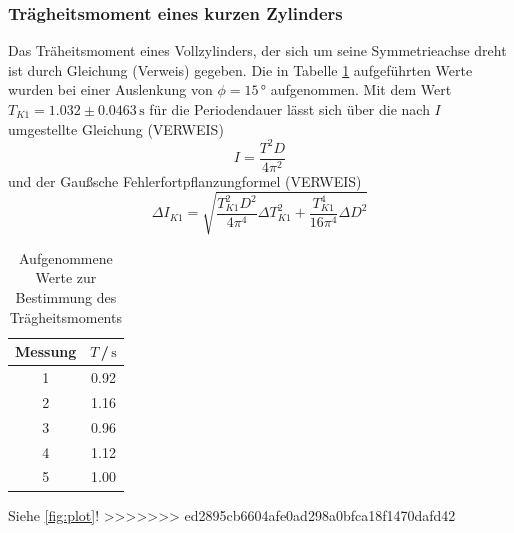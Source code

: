 \subsubsection{Trägheitsmoment eines kurzen Zylinders}

Das Träheitsmoment eines Vollzylinders, der sich um seine Symmetrieachse dreht ist durch 
Gleichung (Verweis) gegeben. Die in Tabelle \ref{tab:a4} aufgeführten Werte wurden bei einer 
Auslenkung von $\phi = 15\,°$ aufgenommen. Mit dem Wert $T_{K1} = 1.032 \pm 0.0463\, \si{\second}$
für die Periodendauer lässt sich über die nach $I$ umgestellte Gleichung (VERWEIS)
\begin{equation}
    I = \frac{T^2 D}{4 \pi^2}
\end{equation}
und der Gaußsche Fehlerfortpflanzungformel (VERWEIS)
\begin{equation} 
    \Delta I_{K1} = \sqrt{\frac{T_{K1}^2 D^2}{4 \pi^4}\Delta T_{K1}^2 + \frac{T_{K1}^4}{16 \pi^4}\Delta D^2} 
\end{equation}



\begin{table}[H]
\normalsize

\centering
{}
\begin{tabular}{c c}
\toprule
    Messung  & $T$\,/\,$\si{\second}$ \\
    \midrule

1  &   0.92   \\
2  &   1.16   \\
3  &   0.96   \\
4  &   1.12   \\
5  &   1.00   \\

    \bottomrule
\end{tabular}
\caption{Aufgenommene Werte zur Bestimmung des Trägheitsmoments}
\label{tab:a4}
\end{table}













Siehe \autoref{fig:plot}!
>>>>>>> ed2895cb6604afe0ad298a0bfca18f1470dafd42
